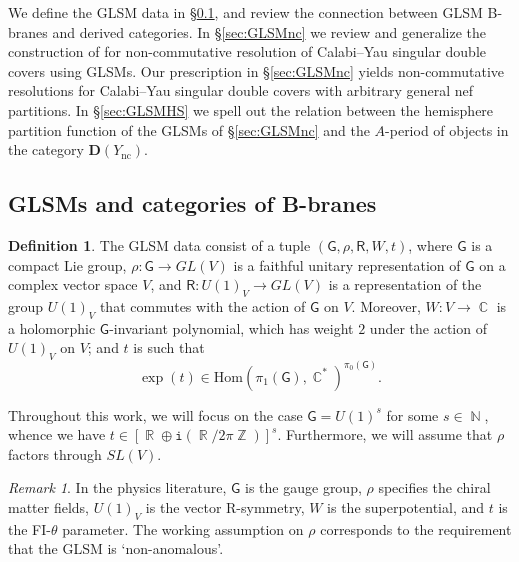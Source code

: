 \documentclass[12pt,a4paper,oneside]{amsart}
\numberwithin{equation}{section}
\theoremstyle{definition}
\newtheorem{defin}[thm]{Definition}
\theoremstyle{remark}
\newtheorem{rmk}[thm]{Remark}
\DeclareMathOperator{\R}{\mathbb{R}}
\DeclareMathOperator{\C}{\mathbb{C}}
\DeclareMathOperator{\N}{\mathbb{N}}
\DeclareMathOperator{\Z}{\mathbb{Z}}
\newcommand{\sR}{\mathsf{R}}
\newcommand{\sG}{\mathsf{G}}
\newcommand{\Ync}{Y_{\mathrm{nc}}}
\newcommand{\DC}{\mathbf{D}}
\newcommand{\ii}{\mathtt{i}}
\begin{document}
We define the GLSM data in \S\ref{sec:GLSMgen}, and review the connection between GLSM B-branes and derived categories. In \S\ref{sec:GLSMnc} we review and generalize the construction of \cite{Lee:2023piu} for non-commutative resolution of Calabi--Yau singular double covers using GLSMs. Our prescription in \S\ref{sec:GLSMnc} yields non-commutative resolutions for Calabi--Yau singular double covers with arbitrary general nef partitions. In \S\ref{sec:GLSMHS} we spell out the relation between the hemisphere partition function \cite{Hori:2013ika,Honda:2013uca} of the GLSMs of \S\ref{sec:GLSMnc} and the $A$-period of objects in the category $\DC (\Ync)$.

\subsection{GLSMs and categories of B-branes}
\label{sec:GLSMgen}
\begin{defin}The GLSM data consist of a tuple $(\sG,\rho, \sR, W, t)$, where $\sG$ is a compact Lie group, $\rho \colon\sG \to GL(V)$ is a faithful unitary representation of $\sG$ on a complex vector space $V $, and $\sR\colon U(1)_V \to GL(V)$ is a representation of the group $U(1)_V$ that commutes with the action of $\sG$ on $V$. Moreover, $W\colon V \to \C$ is a holomorphic $\sG$-invariant polynomial, which has weight $2$ under the action of $U(1)_V$ on $V$; and $t$ is such that 
\begin{equation*}
	\exp (t) \in \mathrm{Hom} \left( \pi_1 (\sG), \C^{\ast} \right)^{\pi_0 (\sG)} .
\end{equation*}
\end{defin}
Throughout this work, we will focus on the case $\sG= U(1)^s$ for some $s \in \N$, whence we have $t \in [\R \oplus \ii \left( \R / 2\pi \Z \right)]^s$. Furthermore, we will assume that $\rho $ factors through $SL(V)$.\par
\begin{rmk}In the physics literature, $\sG$ is the gauge group, $\rho $ specifies the chiral matter fields, $U(1)_V$ is the vector R-symmetry, $W$ is the superpotential, and $t$ is the FI-$\theta$ parameter. The working assumption on $\rho $ corresponds to the requirement that the GLSM is `non-anomalous'.
\end{rmk}
\end{document}
